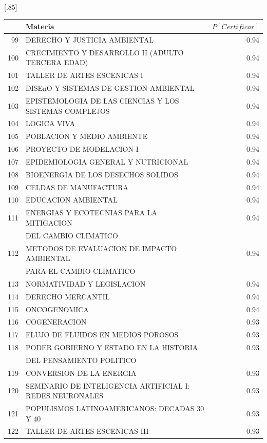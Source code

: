 \documentclass[12pt]{article}
\begin{document}
\begin{table}[ht]
\centering
\scalebox{0.75}[.85]{
\begin{tabular}{rlr}
  \hline
 & Materia & $P[Certificar]$  \\ 
  \hline
  99 & DERECHO Y JUSTICIA AMBIENTAL & 0.94 \\ 
  100 & CRECIMIENTO Y DESARROLLO II (ADULTO TERCERA EDAD) & 0.94 \\ 
  101 & TALLER DE ARTES ESCENICAS I & 0.94 \\ 
  102 & DISEnO Y SISTEMAS DE GESTION AMBIENTAL & 0.94 \\ 
  103 & EPISTEMOLOGIA DE LAS CIENCIAS Y LOS SISTEMAS COMPLEJOS & 0.94 \\ 
  104 & LOGICA VIVA & 0.94 \\ 
  105 & POBLACION Y MEDIO AMBIENTE & 0.94 \\ 
  106 & PROYECTO DE MODELACION I & 0.94 \\ 
  107 & EPIDEMIOLOGIA GENERAL Y NUTRICIONAL & 0.94 \\ 
  108 & BIOENERGIA DE LOS DESECHOS SOLIDOS & 0.94 \\ 
  109 & CELDAS DE MANUFACTURA & 0.94 \\ 
  110 & EDUCACION AMBIENTAL & 0.94 \\ 
  111 & ENERGIAS Y ECOTECNIAS PARA LA MITIGACION& 0.94 \\ 
   & DEL CAMBIO CLIMATICO & \\ 
  112 & METODOS DE EVALUACION DE IMPACTO AMBIENTAL & 0.94 \\ 
  & PARA EL CAMBIO CLIMATICO &  \\ 
  113 & NORMATIVIDAD Y LEGISLACION & 0.94 \\ 
  114 & DERECHO MERCANTIL & 0.94 \\ 
  115 & ONCOGENOMICA & 0.94 \\ 
  116 & COGENERACION & 0.93 \\ 
  117 & FLUJO DE FLUIDOS EN MEDIOS POROSOS & 0.93 \\ 
  118 & PODER GOBIERNO Y ESTADO EN LA HISTORIA  & 0.93 \\ 
   &  DEL PENSAMIENTO POLITICO &  \\ 
  119 & CONVERSION DE LA ENERGIA & 0.93 \\ 
  120 & SEMINARIO DE INTELIGENCIA ARTIFICIAL I: REDES NEURONALES & 0.93 \\ 
  121 & POPULISMOS LATINOAMERICANOS: DECADAS 30 Y 40 & 0.93 \\ 
  122 & TALLER DE ARTES ESCENICAS III & 0.93 \\ 

\end{tabular}}
\end{table}
\end{document}
